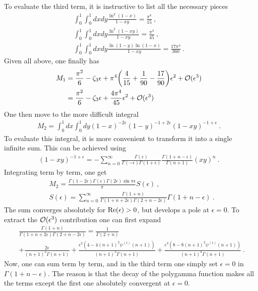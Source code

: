 \documentclass[a4paper,11pt]{article}
\begin{document}
To evaluate the third term, it is instructive to list all the necessary pieces
\begin{align}
\int_{0}^1\int_{0}^{1} dxdy \frac{\ln^2 (1-x)}{1-xy}=\frac{\pi^4}{15} \ , \\ 
\int_{0}^{1}\int_{0}^{1} dxdy\frac{\ln^2(1-xy)}{1-xy}=\frac{\pi^4}{45} \ , \\
\int_{0}^{1}\int_{0}^{1}dxdy \frac{\ln(1-y)\ln(1-x)}{1-xy}=\frac{17\pi^4}{360} \ .
\end{align}
Given all above, one finally has
\begin{align}
M_1&=\frac{\pi^2}{6}-\zeta_3\epsilon +\pi^4\bigg(\frac{4}{15}+\frac{1}{90}-\frac{17}{90}\bigg)\epsilon^2 +{\cal O}(\epsilon^3) \nonumber \\ 
&=\frac{\pi^2}{6}-\zeta_3\epsilon+\frac{4\pi^4}{45}\epsilon^2+{\cal O}(\epsilon^3)
\end{align}
One then move to the more difficult integral
\begin{align}
M_2=\int_{0}^1 dx\int_{0}^1 dy(1-x)^{-2\epsilon}(1-y)^{-1+2\epsilon}(1-xy)^{-1+\epsilon} \ .
\end{align}
To evaluate this integral, it is more convenient to transform it into a single infinite sum. This can be achieved using
\begin{align}
(1-xy)^{-1+\epsilon} =-\sum_{n=0}^{\infty} \frac{\Gamma(\epsilon)}{\Gamma(-\epsilon)\Gamma(1+\epsilon)}\frac{\Gamma(1+n-\epsilon)}{\Gamma(n+1)}(xy)^{n} \ .
\end{align}
Integrating term by term, one get
\begin{align}
&M_2=\frac{\Gamma(1-2\epsilon)\Gamma(\epsilon)\Gamma(2\epsilon)\sin \pi \epsilon}{\pi}S(\epsilon) \ , \\ 
&S(\epsilon)=\sum_{n=0}^{\infty}\frac{\Gamma(1+n)}{\Gamma(1+n+2\epsilon)\Gamma(2+n-2\epsilon)}\Gamma(1+n-\epsilon) \ .
\end{align}
The sum converges absolutely for ${\rm Re}(\epsilon)>0$, but develops a pole at $\epsilon=0$. To extract the ${\cal O}(\epsilon^3)$ contribution one can first expand
\begin{align}
&\frac{\Gamma(1+n)}{\Gamma(1+n+2\epsilon)\Gamma(2+n-2\epsilon)}=\frac{1}{\Gamma(2+n)}\nonumber \\ 
&+\frac{2 \epsilon}{(n+1)^2 \Gamma (n+1)}+\frac{\epsilon^2 \left(4-4 (n+1)^2 \psi ^{(1)}(n+1)\right)}{(n+1)^3 \Gamma (n+1)}+\frac{\epsilon^3 \left(8-8 (n+1)^2 \psi ^{(1)}(n+1)\right)}{(n+1)^4 \Gamma (n+1)} \ .
\end{align}
Now, one can sum term by term, and in the third term one simply set $\epsilon=0$ in $\Gamma(1+n-\epsilon)$. The reason is that the decay of the polygamma function makes all the terms except the first one absolutely convergent at $\epsilon=0$.
\end{document}
